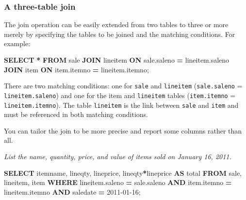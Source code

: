 \documentclass[
]{article}
\newenvironment{Shaded}{\begin{snugshade}}{\end{snugshade}}
\newcommand{\KeywordTok}[1]{\textcolor[rgb]{0.13,0.29,0.53}{\textbf{#1}}}
\newcommand{\NormalTok}[1]{#1}
\newcommand{\OperatorTok}[1]{\textcolor[rgb]{0.81,0.36,0.00}{\textbf{#1}}}
\newcommand{\StringTok}[1]{\textcolor[rgb]{0.31,0.60,0.02}{#1}}
\begin{document}
\hypertarget{a-three-table-join}{%
\subsubsection*{A three-table join}\label{a-three-table-join}}

The join operation can be easily extended from two tables to three or more merely by specifying the tables to be joined and the matching conditions. For example:

\begin{Shaded}
\begin{Highlighting}[]
\KeywordTok{SELECT} \OperatorTok{*} \KeywordTok{FROM}\NormalTok{ sale }\KeywordTok{JOIN}\NormalTok{ lineitem }
    \KeywordTok{ON}\NormalTok{ sale.saleno }\OperatorTok{=}\NormalTok{ lineitem.saleno}
    \KeywordTok{JOIN}\NormalTok{ item}
    \KeywordTok{ON}\NormalTok{ item.itemno }\OperatorTok{=}\NormalTok{ lineitem.itemno;}
\end{Highlighting}
\end{Shaded}

There are two matching conditions: one for \texttt{sale} and \texttt{lineitem} (\texttt{sale.saleno} = \texttt{lineitem.saleno}) and one for the item and \texttt{lineitem} tables (\texttt{item.itemno} = \texttt{lineitem.itemno}). The table \texttt{lineitem} is the link between \texttt{sale} and \texttt{item} and must be referenced in both matching conditions.

You can tailor the join to be more precise and report some columns rather than all.

\emph{List the name, quantity, price, and value of items sold on January 16, 2011.}

\begin{Shaded}
\begin{Highlighting}[]
\KeywordTok{SELECT}\NormalTok{ itemname, lineqty, lineprice, lineqty}\OperatorTok{*}\NormalTok{lineprice }\KeywordTok{AS}\NormalTok{ total}
    \KeywordTok{FROM}\NormalTok{ sale, lineitem, item}
        \KeywordTok{WHERE}\NormalTok{ lineitem.saleno }\OperatorTok{=}\NormalTok{ sale.saleno}
        \KeywordTok{AND}\NormalTok{ item.itemno }\OperatorTok{=}\NormalTok{ lineitem.itemno}
        \KeywordTok{AND}\NormalTok{ saledate }\OperatorTok{=} \StringTok{\textquotesingle{}2011{-}01{-}16\textquotesingle{}}\NormalTok{;}
\end{Highlighting}
\end{Shaded}
\end{document}

